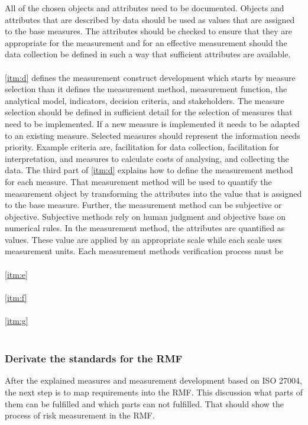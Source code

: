 All of the chosen objects and attributes need to be documented. Objects and attributes that are described by data should be used as values that are assigned to the base measures. The attributes should be checked to ensure that they are appropriate for the measurement and for an effective measurement should the data collection be defined in such a way that sufficient attributes are available. \\ \\
\ref{itm:d} defines the measurement construct development which starts by measure selection than it defines the measurement method, measurement function, the analytical model, indicators, decision criteria, and stakeholders. The measure selection should be defined in sufficient detail for the selection of measures that need to be implemented. If a new measure is implemented it needs to be adapted to an existing measure. Selected measures should represent the information needs priority. Example criteria are, facilitation for data collection, facilitation for interpretation, and measures to calculate costs of analysing, and collecting the data. The third part of \ref{itm:d} explains how to define the measurement method for each measure. That measurement method will be used to quantify the measurement object by transforming the attributes into the value that is assigned to the base measure. Further, the measurement method can be subjective or objective. Subjective methods rely on human judgment and objective base on numerical rules. In the measurement method, the attributes are quantified as values. These value are applied by an appropriate scale while each scale uses measurement units. Each measurement methods verification process must be  \\ \\
\ref{itm:e} \\ \\
\ref{itm:f} \\ \\
\ref{itm:g} \\ \\

\subsubsection*{Derivate the standards for the RMF}

After the explained measures and measurement development based on ISO 27004, the next step is to map requirements into the RMF. This discussion what parts of them can be fulfilled and which parts can not fulfilled. That should show the process of risk measurement in the RMF.

